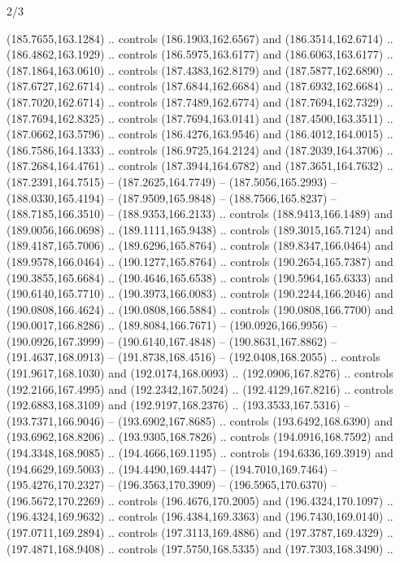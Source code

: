 \begin{flagdescription}{2/3}
\begin{scope}[xshift=0.5\flaglength,yshift=0.5\flagwidth,scale=\flagwidth/180]
\begin{scope}[y=0.8pt, x=0.8pt, yscale=-1,shift={(-168.75,-108.75)}]
  (185.7655,163.1284) .. controls (186.1903,162.6567) and (186.3514,162.6714) ..
  (186.4862,163.1929) .. controls (186.5975,163.6177) and (186.6063,163.6177) ..
  (187.1864,163.0610) .. controls (187.4383,162.8179) and (187.5877,162.6890) ..
  (187.6727,162.6714) .. controls (187.6844,162.6684) and (187.6932,162.6684) ..
  (187.7020,162.6714) .. controls (187.7489,162.6774) and (187.7694,162.7329) ..
  (187.7694,162.8325) .. controls (187.7694,163.0141) and (187.4500,163.3511) ..
  (187.0662,163.5796) .. controls (186.4276,163.9546) and (186.4012,164.0015) ..
  (186.7586,164.1333) .. controls (186.9725,164.2124) and (187.2039,164.3706) ..
  (187.2684,164.4761) .. controls (187.3944,164.6782) and (187.3651,164.7632) ..
  (187.2391,164.7515) -- (187.2625,164.7749) -- (187.5056,165.2993) --
  (188.0330,165.4194) -- (187.9509,165.9848) -- (188.7566,165.8237) --
  (188.7185,166.3510) -- (188.9353,166.2133) .. controls (188.9413,166.1489) and
  (189.0056,166.0698) .. (189.1111,165.9438) .. controls (189.3015,165.7124) and
  (189.4187,165.7006) .. (189.6296,165.8764) .. controls (189.8347,166.0464) and
  (189.9578,166.0464) .. (190.1277,165.8764) .. controls (190.2654,165.7387) and
  (190.3855,165.6684) .. (190.4646,165.6538) .. controls (190.5964,165.6333) and
  (190.6140,165.7710) .. (190.3973,166.0083) .. controls (190.2244,166.2046) and
  (190.0808,166.4624) .. (190.0808,166.5884) .. controls (190.0808,166.7700) and
  (190.0017,166.8286) .. (189.8084,166.7671) -- (190.0926,166.9956) --
  (190.0926,167.3999) -- (190.6140,167.4848) -- (190.8631,167.8862) --
  (191.4637,168.0913) -- (191.8738,168.4516) -- (192.0408,168.2055) .. controls
  (191.9617,168.1030) and (192.0174,168.0093) .. (192.0906,167.8276) .. controls
  (192.2166,167.4995) and (192.2342,167.5024) .. (192.4129,167.8216) .. controls
  (192.6883,168.3109) and (192.9197,168.2376) .. (193.3533,167.5316) --
  (193.7371,166.9046) -- (193.6902,167.8685) .. controls (193.6492,168.6390) and
  (193.6962,168.8206) .. (193.9305,168.7826) .. controls (194.0916,168.7592) and
  (194.3348,168.9085) .. (194.4666,169.1195) .. controls (194.6336,169.3919) and
  (194.6629,169.5003) .. (194.4490,169.4447) -- (194.7010,169.7464) --
  (195.4276,170.2327) -- (196.3563,170.3909) -- (196.5965,170.6370) --
  (196.5672,170.2269) .. controls (196.4676,170.2005) and (196.4324,170.1097) ..
  (196.4324,169.9632) .. controls (196.4384,169.3363) and (196.7430,169.0140) ..
  (197.0711,169.2894) .. controls (197.3113,169.4886) and (197.3787,169.4329) ..
  (197.4871,168.9408) .. controls (197.5750,168.5335) and (197.7303,168.3490) ..

\end{scope}
\end{scope}
\end{flagdescription}
